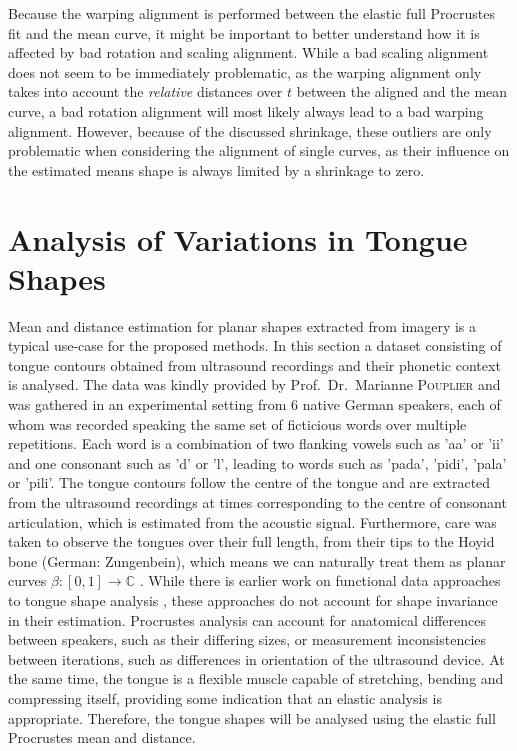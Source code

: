 Because the warping alignment is performed between the elastic full Procrustes fit and the mean curve, it might be important to better understand how it is affected by bad rotation and scaling alignment.
While a bad scaling alignment does not seem to be immediately problematic, as the warping alignment only takes into account the \emph{relative} distances over $t$ between the aligned and the mean curve, a bad rotation alignment will most likely always lead to a bad warping alignment.
However, because of the discussed shrinkage, these outliers are only problematic when considering the alignment of single curves, as their influence on the estimated means shape is always limited by a shrinkage to zero.


\section{Analysis of Variations in Tongue Shapes}
\label{sec:4-tounges}
Mean and distance estimation for planar shapes extracted from imagery is a typical use-case for the proposed methods.
In this section a dataset consisting of tongue contours obtained from ultrasound recordings and their phonetic context is analysed.
The data was kindly provided by Prof.\ Dr.\ Marianne \textsc{Pouplier} and was gathered in an experimental setting from 6 native German speakers, each of whom was recorded speaking the same set of ficticious words over multiple repetitions.
Each word is a combination of two flanking vowels such as 'aa' or 'ii' and one consonant such as 'd' or 'l', leading to words such as 'pada', 'pidi', 'pala' or 'pili'.
The tongue contours follow the centre of the tongue and are extracted from the ultrasound recordings at times corresponding to the centre of consonant articulation, which is estimated from the acoustic signal.
Furthermore, care was taken to observe the tongues over their full length, from their tips to the Hoyid bone (German: Zungenbein),  which means we can naturally treat them as planar curves $\beta : [0,1] \rightarrow \mathbb{C}$ \parencite[see][]{consulting}.
While there is earlier work on functional data approaches to tongue shape analysis \parencite{CederbaumEtAl2016,Davidson2006,PouplierEtAl2014}, these approaches do not account for shape invariance in their estimation.
Procrustes analysis can account for anatomical differences between speakers, such as their differing sizes, or measurement inconsistencies between iterations, such as differences in orientation of the ultrasound device.
At the same time, the tongue is a flexible muscle capable of stretching, bending and compressing itself, providing some indication that an elastic analysis is appropriate. 
Therefore, the tongue shapes will be analysed using the elastic full Procrustes mean and distance.

